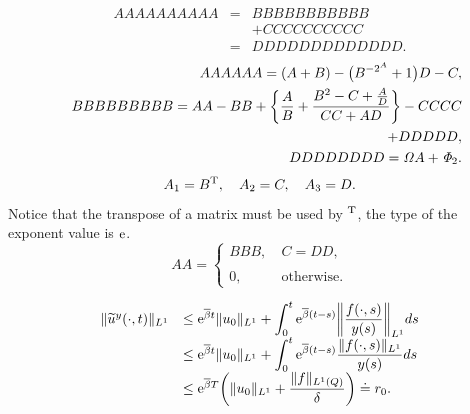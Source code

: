 \documentclass{jssc}
\def\q{\quad} \def\qq{\qquad}
\def\ee{{\rm e}}
\def\ay{\arraycolsep=1.5pt}
\def\d{\displaystyle}
\def\dfrac{\displaystyle\frac}
\begin{document}
\ay
\begin{eqnarray}\label{E:1.2}
AAAAAAAAAA &=& BBBBBBBBBBB\nonumber \\
           && + CCCCCCCCCC\nonumber \\
           &=& DDDDDDDDDDDDD.
\end{eqnarray}
\ay
\begin{eqnarray}\label{E:1.3}
&&AAAAAA =(A+B)-\big(B^{-2^A}+1\big)D-C,\nonumber \\
&&BBBBBBBBB=AA-BB+\bigg\{\frac{A}{B}+
\dfrac{B^2-C+\frac{A}{D}}{CC+AD}\bigg\}-CCCC\nonumber \\
&&\hspace{3cm}+DDDDD,\nonumber \\
&&DDDDDDDD={\it \Omega}A+{\it \Phi}_{2}.
\end{eqnarray}
\begin{eqnarray}\label{E:1.4}
A_{1}=B^{\rm T},\q A_{2}=C, \q A_{3}=D.
\end{eqnarray}
Notice that the transpose of a matrix must be used by $^{\rm T}$,
the type of the exponent value is ${\rm e}$.
\begin{displaymath}
 AA=\left\{
                   \begin{array}{ll}
                     BBB, \ & C=DD, \\
\\
                     0,\  & \mbox{otherwise}.
                   \end{array}
                 \right.
 \end{displaymath}


\begin{equation}
\begin{array}[b]{ll}
\|\tilde{u}^{y}(\cdot,t)\|_{L^{1}}&\leq
\ee^{\bar{\beta}t}\|u_{0}\|_{L^{1}}
+\d\int_{0}^{t}\ee^{\bar{\beta}(t-s)}\bigg\|\dfrac{f(\cdot,s)}{y(s)}\bigg\|_{L^{1}}ds \\
&\leq \ee^{\bar{\beta}t}\|u_{0}\|_{L^{1}}+\d\int_{0}^{t}\ee^{\bar{\beta}(t-s)}\dfrac{\|f(\cdot,s)\|_{L^{1}}}{y(s)}ds \\
&\leq
\ee^{\bar{\beta}T}\bigg(\|u_{0}\|_{L^{1}}+\dfrac{\|f\|_{L^{1}(Q)}}{\delta}\bigg)\doteq
r_{0}.
\end{array}
\end{equation}
\end{document}
